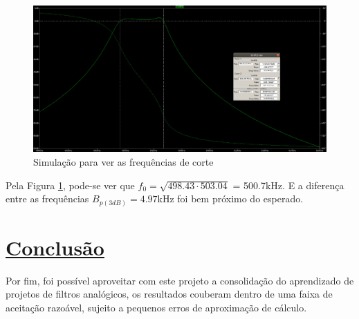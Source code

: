 \documentclass[14pt, oneside]{book}
\newcommand\tab[1][1cm]{\hspace*{#1}}
\theoremstyle{definition}
\begin{document}
            \begin{figure}[H]
                \centering
                \includegraphics[scale=0.4]{PASSAMEDIDA.jpeg}
                \caption{Simulação para ver as frequências de corte}
                \label{fdown1}
            \end{figure}
            
            Pela Figura \ref{fdown1}, pode-se ver que $f_0 = \sqrt{498.43\cdot503.04 }$ = 500.7kHz. E a diferença entre as frequências $B_{p(3dB)}=4.97$kHz foi bem próximo do esperado.
                 
             
        \chapter[Conclusão]{\hyperlink{toc}{Conclusão}}
            \tab Por fim, foi possível aproveitar com este projeto a consolidação do aprendizado de projetos de filtros analógicos, os resultados couberam dentro de uma faixa de aceitação razoável, sujeito a pequenos erros de aproximação de cálculo.
\end{document}
